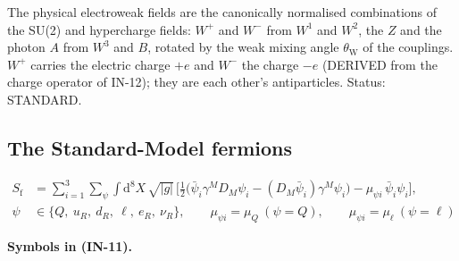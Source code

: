 \documentclass[
  10pt,
]{article}
\begin{document}
The physical electroweak fields are the canonically normalised
combinations of the SU(2) and hypercharge fields: \(W^+\) and \(W^-\)
from \(W^1\) and \(W^2\), the \(Z\) and the photon \(A\) from \(W^3\)
and \(B\), rotated by the weak mixing angle \(\theta_{\mathrm{W}}\) of
the couplings. \(W^+\) carries the electric charge \(+e\) and \(W^-\)
the charge \(-e\) (DERIVED from the charge operator of IN-12); they are
each other's antiparticles. Status: STANDARD.

\hypertarget{the-standard-model-fermions}{%
\subsection{The Standard-Model
fermions}\label{the-standard-model-fermions}}

\[
\begin{aligned}
S_{\mathrm{f}} &= \sum_{i=1}^{3}\sum_{\psi}\int\mathrm{d}^8X\,\sqrt{\lvert
 g\rvert}\,\Big[\tfrac12\big(\bar\psi_i\gamma^MD_M\psi_i
 - (D_M\bar\psi_i)\gamma^M\psi_i\big) - \mu_{\psi i}\,\bar\psi_i\psi_i\Big],\\
\psi &\in \{Q,\ u_R,\ d_R,\ \ell,\ e_R,\ \nu_R\},\qquad \mu_{\psi i} = \mu_Q\ (\psi = Q),\qquad
 \mu_{\psi i} = \mu_\ell\ (\psi = \ell)
\end{aligned} \tag{IN-11}
\]

\textbf{Symbols in (IN-11).}
\end{document}
